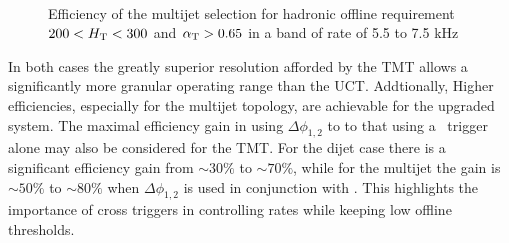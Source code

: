 \begin{figure}
\centering
	~
	\caption{Efficiency of the multijet selection for hadronic offline requirement $200 < \mbox{$H_\text{T}$} < 300$ and $\alpha_{\text{T}} > 0.65$
	in a band of rate of 5.5 to 7.5 kHz}	
	    \label{fig:multijet_cross}
\end{figure}

In both cases the greatly superior resolution afforded by the TMT allows a significantly
more granular operating range than the UCT. Addtionally, Higher efficiencies, especially for the multijet topology, 
are achievable for the upgraded system. The maximal efficiency gain in using $\Delta\phi_{1,2}$ to 
to that using a \scalht~trigger alone may also be considered for the TMT. For the dijet case there is a 
significant efficiency gain from $\sim 30\%$ to $\sim 70\%$, while for the multijet the gain is 
$\sim 50\%$ to $\sim 80\%$ when $\Delta\phi_{1,2}$ is used in conjunction with \scalht.
This highlights the importance of cross triggers in controlling rates while 
keeping low offline thresholds.

